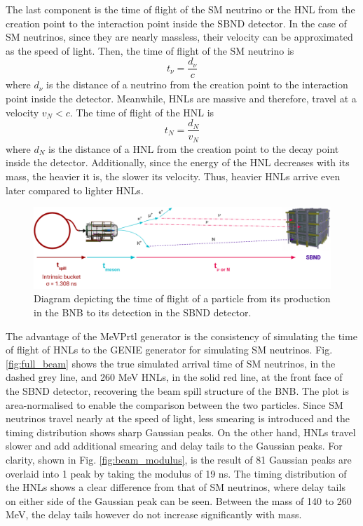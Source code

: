 The last component is the time of flight of the SM neutrino or the HNL from the creation point to the interaction point inside the SBND detector.
In the case of SM neutrinos, since they are nearly massless, their velocity can be approximated as the speed of light. 
Then, the time of flight of the SM neutrino is  
\begin{equation}
	t_{\nu} = \frac{d_{\nu}}{c}
\end{equation}
where $d_{\nu}$ is the distance of a neutrino from the creation point to the interaction point inside the detector.
Meanwhile, HNLs are massive and therefore, travel at a velocity $v_N < c$.
The time of flight of the HNL is
\begin{equation}
	t_{N} = \frac{d_{N}}{v_N}
\end{equation}
where $d_N$ is the distance of a HNL from the creation point to the decay point inside the detector.
Additionally, since the energy of the HNL decreases with its mass, the heavier it is, the slower its velocity.
Thus, heavier HNLs arrive even later compared to lighter HNLs.

\begin{figure}[hb!] 
\centering    
\includegraphics[width=1.0\textwidth]{tof_beam_to_detector}
\caption[Time of Flight of Particles From the BNB to SBND Diagram]{
Diagram depicting the time of flight of a particle from its production in the BNB to its detection in the SBND detector.
}
\label{fig:tof_beam_to_detector}
\end{figure}

The advantage of the MeVPrtl generator is the consistency of simulating the time of flight of HNLs to the GENIE generator for simulating SM neutrinos.
Fig. \ref{fig:full_beam} shows the true simulated arrival time of SM neutrinos, in the dashed grey line, and 260 MeV HNLs, in the solid red line, at the front face of the SBND detector, recovering the beam spill structure of the BNB.
The plot is area-normalised to enable the comparison between the two particles. 
Since SM neutrinos travel nearly at the speed of light, less smearing is introduced and the timing distribution shows sharp Gaussian peaks.
On the other hand, HNLs travel slower and add additional smearing and delay tails to the Gaussian peaks.
For clarity, shown in Fig. \ref{fig:beam_modulus}, is the result of 81 Gaussian peaks are overlaid into 1 peak by taking the modulus of 19 ns.
The timing distribution of the HNLs shows a clear difference from that of SM neutrinos, where delay tails on either side of the Gaussian peak can be seen.
Between the mass of 140 to 260 MeV, the delay tails however do not increase significantly with mass.

